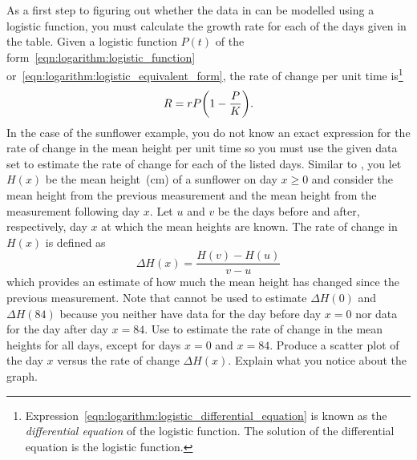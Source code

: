 \documentclass[a4paper,oneside,12pt]{article}
\begin{document}
\begin{problem}
\begin{packedenum}
  \item\label{subprob:logarithm:logistic_sunflower_growth_rates}
    As a first step to figuring out whether the data in
     can be modelled using a logistic
    function, you must calculate the growth rate for each of the days
    given in the table.  Given a logistic function $P(t)$ of the
    form~\eqref{eqn:logarithm:logistic_function}
    or~\eqref{eqn:logarithm:logistic_equivalent_form}, the rate of
    change per unit time is\footnote{
      Expression~\eqref{eqn:logarithm:logistic_differential_equation}
      is known as the \emph{differential equation} of the logistic
      function.  The solution of the differential equation is the
      logistic function.
    }
    \begin{equation}
    \label{eqn:logarithm:logistic_differential_equation}
    R
    =
    r P
    \parenthesis*{
      1 - \frac{P}{K}
    }.
    \end{equation}
    In the case of the sunflower example, you do not know an exact
    expression for the rate of change in the mean height per unit time
    so you must use the given data set to estimate the rate of change
    for each of the listed days.  Similar to
    ,
    you let $H(x)$ be the mean height~(cm) of a sunflower on day
    $x \geq 0$ and consider the mean height from the previous
    measurement and the mean height from the measurement following day
    $x$.  Let $u$ and $v$ be the days before and after, respectively,
    day $x$ at which the mean heights are known.  The rate of change
    in $H(x)$ is defined as
    \begin{equation}
    \label{eqn:logarithm:logistic_sunflower_growth_rate}
    \Delta H(x)
    =
    \frac{
      H(v) - H(u)
    }{
      v - u
    }
    \end{equation}
    which provides an estimate of how much the mean height has changed
    since the previous measurement.  Note that
     cannot be
    used to estimate $\Delta H(0)$ and $\Delta H(84)$ because you
    neither have data for the day before day $x = 0$ nor data for the
    day after day $x = 84$.  Use
     to
    estimate the rate of change in the mean heights for all days,
    except for days $x = 0$ and $x = 84$.  Produce a scatter plot of
    the day $x$ versus the rate of change $\Delta H(x)$.  Explain what
    you notice about the graph.


\end{packedenum}
\end{problem}
\end{document}
